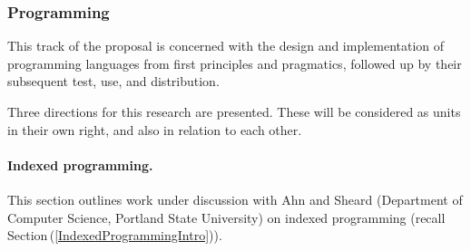 \documentclass[11pt,twocolumn]{article}
\newcommand{\pref}[1]{\,(\ref{#1})}
\begin{document}
\subsubsection{Programming}
\label{Programming}

This track of the proposal is concerned with the design and implementation
of programming languages from first principles and pragmatics, followed up
by their subsequent test, use, and distribution.

Three directions for this research are presented.  These will be
considered as units in their own right, and also in relation to each other.

\setcounter{paragraph}{0}
\paragraph{Indexed programming.}
\label{IndexedProgrammingParagraph}

This section outlines work under discussion with Ahn and Sheard
(Department of Computer Science, Portland State University) on indexed
programming (recall Section\pref{IndexedProgrammingIntro}).
\end{document}
